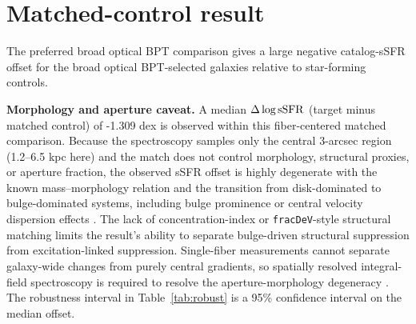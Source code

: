 \documentclass[twocolumn]{aastex631}
\begin{document}
\section{Matched-control result}
The preferred broad optical BPT comparison gives a large negative catalog-sSFR offset for the broad optical BPT-selected galaxies relative to star-forming controls.
\par\noindent\textbf{Morphology and aperture caveat.} A median $\Delta\log {\rm sSFR}$ (target minus matched control) of -1.309 dex is observed within this fiber-centered matched comparison. Because the spectroscopy samples only the central 3-arcsec region (1.2--6.5 kpc here) and the match does not control morphology, structural proxies, or aperture fraction, the observed sSFR offset is highly degenerate with the known mass--morphology relation and the transition from disk-dominated to bulge-dominated systems, including bulge prominence or central velocity dispersion effects \citep{schawinski2010,bluck2014,belfiore2016}. The lack of concentration-index or \texttt{fracDeV}-style structural matching limits the result's ability to separate bulge-driven structural suppression from excitation-linked suppression. Single-fiber measurements cannot separate galaxy-wide changes from purely central gradients, so spatially resolved integral-field spectroscopy is required to resolve the aperture-morphology degeneracy \citep{penny2018,cheung2016}. The robustness interval in Table~\ref{tab:robust} is a 95\% confidence interval on the median offset.
\end{document}
